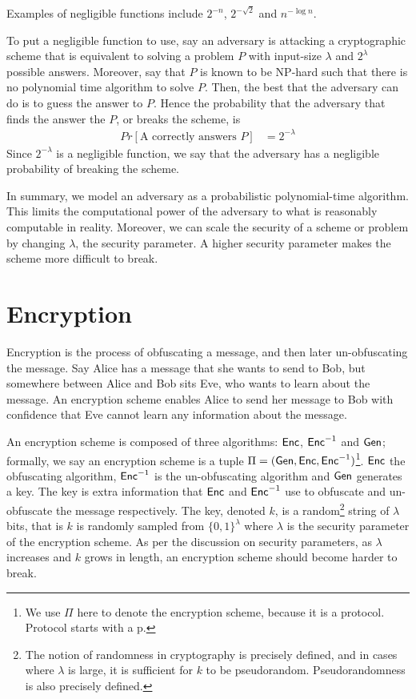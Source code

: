 Examples of negligible functions include $2^{-n}$, $2^{- \sqrt{2}}$ and $n^{- \log n}$. 

To put a negligible function to use, say an adversary is attacking a cryptographic scheme that is equivalent to solving a problem $P$ with input-size $\lambda$ and $2^{\lambda}$ possible answers. 
Moreover, say that $P$ is known to be NP-hard such that there is no polynomial time algorithm to solve $P$. 
Then, the best that the adversary can do is to guess the answer to $P$.
Hence the probability that the adversary that finds the answer the $P$, or breaks the scheme, is 
\begin{align*}
Pr[\text{A correctly answers $P$}] & = {2^{- \lambda}}
\end{align*}
Since $2^{- \lambda}$ is a negligible function, we say that the adversary has a negligible probability of breaking the scheme. 

In summary, we model an adversary as a probabilistic polynomial-time algorithm. 
This limits the computational power of the adversary to what is reasonably computable in reality. 
Moreover, we can scale the security of a scheme or problem by changing $\lambda$, the security parameter. 
A higher security parameter makes the scheme more difficult to break. 

\section{Encryption}

Encryption is the process of obfuscating a message, and then later un-obfuscating the message.
Say Alice has a message that she wants to send to Bob, but somewhere between Alice and Bob sits Eve, who wants to learn about the message.
An encryption scheme enables Alice to send her message to Bob with confidence that Eve cannot learn any information about the message. 

An encryption scheme is composed of three algorithms: $\textsf{Enc}$, $\textsf{Enc}^{-1}$ and $\textsf{Gen}$; formally, we say an encryption scheme is a tuple $\Pi = (\textsf{Gen}, \textsf{Enc}, \textsf{Enc}^{-1})$\footnote{We use $\Pi$ here to denote the encryption scheme, because it is a protocol. Protocol starts with a p.}.
$\textsf{Enc}$ the obfuscating algorithm, $\textsf{Enc}^{-1}$ is the un-obfuscating algorithm and $\textsf{Gen}$ generates a key. 
The key is extra information that $\textsf{Enc}$ and $\textsf{Enc}^{-1}$ use to obfuscate and un-obfuscate the message respectively. 
The key, denoted $k$, is a random\footnote{The notion of randomness in cryptography is precisely defined, and in cases where $\lambda$ is large, it is sufficient for $k$ to be pseudorandom. Pseudorandomness is also precisely defined.} string of $\lambda$ bits, that is $k$ is randomly sampled from $\{0,1\}^{\lambda}$  where $\lambda$ is the security parameter of the encryption scheme. 
As per the discussion on security parameters, as $\lambda$ increases and $k$ grows in length, an encryption scheme should become harder to break.

